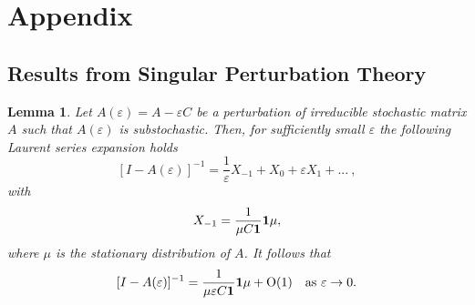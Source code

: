 \documentclass{article}
\newtheorem{lemma}{Lemma}
\newcommand{\eps}{\varepsilon}
\newcommand{\one}{{\bf 1}}
\begin{document}
\renewcommand{\theequation}{A.\arabic{equation}}
\setcounter{equation}{0}  \renewcommand{\thesubsection}{A.\arabic{subsection}}
\setcounter{subsection}{0}  \renewcommand{\thelemma}{A.\arabic{lemma}}
\setcounter{lemma}{0}  \section*{Appendix}

\subsection{Results from Singular Perturbation Theory}

\begin{lemma}
\label{lm:sp} Let $A(\eps)=A-\eps C$ be a perturbation of
irreducible stochastic matrix $A$ such that $A(\eps)$ is
substochastic. Then, for sufficiently small $\eps$ the following
Laurent series expansion holds
\[[I-A(\eps)]^{-1}=\frac{1}{\eps}X_{-1}+X_0+\eps
X_1+... \ ,
\]
with
$$
X_{-1}=\frac{1}{\mu C \one} \one \mu,
$$
where $\mu$ is the stationary distribution of $A$. It follows that
\begin{equation}
\label{eq:LaurentX} [I-A(\eps)]^{-1}=\frac{1}{\mu \eps C \one}
\one \mu + \mbox{O}(1)\quad\mbox{as } \eps\to 0.
\end{equation}

\end{lemma}
\end{document}
